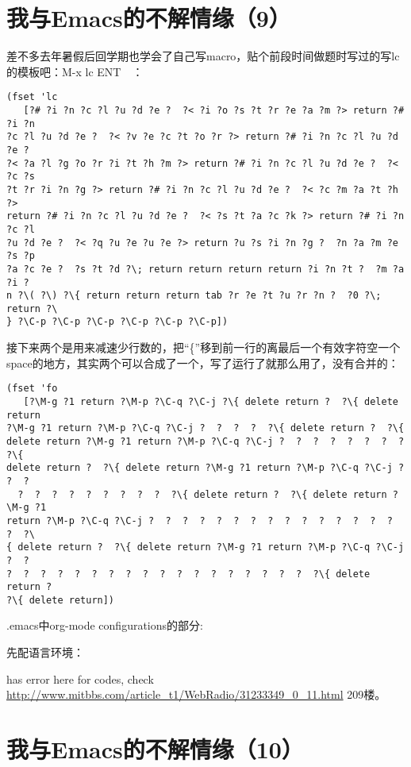 \documentclass[12pt]{book}
\begin{document}
\section{我与Emacs的不解情缘（9）}
\label{sec-6-9}

差不多去年暑假后回学期也学会了自己写macro，贴个前段时间做题时写过的写lc的模板吧：M-x lc ENT　：

\lstset{language=java,label= ,caption= ,numbers=none}
\begin{lstlisting}
(fset 'lc
   [?# ?i ?n ?c ?l ?u ?d ?e ?  ?< ?i ?o ?s ?t ?r ?e ?a ?m ?> return ?# ?i ?n
?c ?l ?u ?d ?e ?  ?< ?v ?e ?c ?t ?o ?r ?> return ?# ?i ?n ?c ?l ?u ?d ?e ? 
?< ?a ?l ?g ?o ?r ?i ?t ?h ?m ?> return ?# ?i ?n ?c ?l ?u ?d ?e ?  ?< ?c ?s
?t ?r ?i ?n ?g ?> return ?# ?i ?n ?c ?l ?u ?d ?e ?  ?< ?c ?m ?a ?t ?h ?> 
return ?# ?i ?n ?c ?l ?u ?d ?e ?  ?< ?s ?t ?a ?c ?k ?> return ?# ?i ?n ?c ?l
?u ?d ?e ?  ?< ?q ?u ?e ?u ?e ?> return ?u ?s ?i ?n ?g ?  ?n ?a ?m ?e ?s ?p
?a ?c ?e ?  ?s ?t ?d ?\; return return return return ?i ?n ?t ?  ?m ?a ?i ?
n ?\( ?\) ?\{ return return return tab ?r ?e ?t ?u ?r ?n ?  ?0 ?\; return ?\
} ?\C-p ?\C-p ?\C-p ?\C-p ?\C-p ?\C-p])
\end{lstlisting}

接下来两个是用来减速少行数的，把“\{”移到前一行的离最后一个有效字符空一个space的地方，其实两个可以合成了一个，写了运行了就那么用了，没有合并的：

\lstset{language=java,label= ,caption= ,numbers=none}
\begin{lstlisting}
(fset 'fo
   [?\M-g ?1 return ?\M-p ?\C-q ?\C-j ?\{ delete return ?  ?\{ delete return
?\M-g ?1 return ?\M-p ?\C-q ?\C-j ?  ?  ?  ?  ?\{ delete return ?  ?\{ 
delete return ?\M-g ?1 return ?\M-p ?\C-q ?\C-j ?  ?  ?  ?  ?  ?  ?  ?  ?\{ 
delete return ?  ?\{ delete return ?\M-g ?1 return ?\M-p ?\C-q ?\C-j ?  ?  ?
  ?  ?  ?  ?  ?  ?  ?  ?  ?  ?\{ delete return ?  ?\{ delete return ?\M-g ?1
return ?\M-p ?\C-q ?\C-j ?  ?  ?  ?  ?  ?  ?  ?  ?  ?  ?  ?  ?  ?  ?  ?  ?\
{ delete return ?  ?\{ delete return ?\M-g ?1 return ?\M-p ?\C-q ?\C-j ?  ? 
?  ?  ?  ?  ?  ?  ?  ?  ?  ?  ?  ?  ?  ?  ?  ?  ?  ?  ?\{ delete return ?  
?\{ delete return])
\end{lstlisting}

.emacs中org-mode configurations的部分:

先配语言环境：

has error here for codes, check \url{http://www.mitbbs.com/article_t1/WebRadio/31233349_0_11.html} 209楼。

\section{我与Emacs的不解情缘（10）}
\label{sec-6-10}
\end{document}
